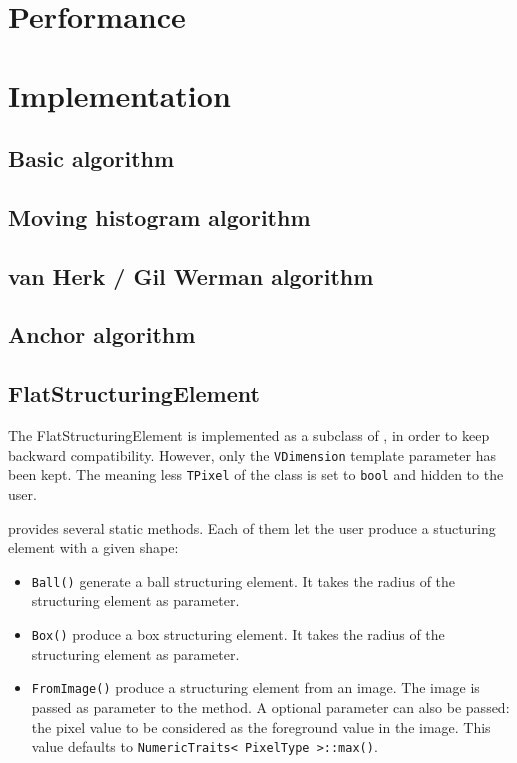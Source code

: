 \documentclass{InsightArticle}
\begin{document}
\section{Performance}

% 

\section{Implementation}

 \subsection{Basic algorithm}

 \subsection{Moving histogram algorithm}

 \subsection{van Herk / Gil Werman algorithm}

 \subsection{Anchor algorithm}

 \subsection{FlatStructuringElement}

The FlatStructuringElement is implemented as a subclass of , in order to
keep backward compatibility. However, only the \verb$VDimension$ template parameter has
been kept. The meaning less \verb$TPixel$ of the  class is set to
\verb$bool$ and hidden to the user.

 provides several static methods. Each of them let the user
produce a stucturing element with a given shape:
\begin{itemize}
  \item \verb$Ball()$ generate a ball structuring element. It takes the radius of the structuring
element as parameter.
  \item \verb$Box()$ produce a box structuring element. It takes the radius of the structuring
element as parameter.
  \item \verb$FromImage()$ produce a structuring element from an image. The image is passed
as parameter to the method. A optional parameter can also be passed: the pixel value
to be considered as the foreground value in the image. This value defaults to
\verb$NumericTraits< PixelType >::max()$.
\end{itemize}
\end{document}
